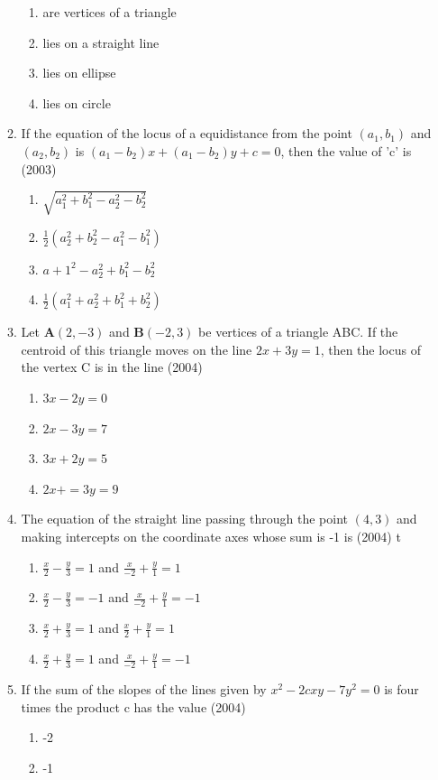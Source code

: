 \documentclass[12pt]{article}
\let\vec\mathbf
\begin{document}
\begin{enumerate}
\begin{enumerate}
\begin{enumerate}
\item are vertices of a triangle
\item lies on a straight line
\item lies on ellipse
\item lies on circle
\end{enumerate}
\item If the equation of the locus of a equidistance from the point $(a_1,b_1)$ and $(a_2,b_2)$ is $(a_1-b_2)x+(a_1-b_2)y+c=0$, then the value of 'c' is (2003)
\begin{enumerate}
\item $\sqrt{a_1^2+b_1^2-a_2^2-b_2^2}$
\item $\frac{1}{2}(a_2^2+b_2^2-a_1^2-b_1^2)$
\item $a+1^2-a_2^2+b_1^2-b_2^2$
\item $\frac{1}{2}(a_1^2+a_2^2+b_1^2+b_2^2)$
\end{enumerate}
\item Let $\vec{A}(2,-3)$ and $\vec{B}(-2,3)$ be vertices of a triangle ABC. If the centroid of this triangle moves on the line $2x+3y=1$, then the locus of the vertex C is in the line  (2004)
\begin{enumerate}
\item $3x-2y=0$
\item $2x-3y=7$ 
\item $3x+2y=5$ 
\item $2x+=3y=9$
\end{enumerate}
\item The equation of the straight line passing through the point $(4,3)$ and making intercepts on the coordinate axes whose sum is -1 is (2004)
t\begin{enumerate}
\item $\frac{x}{2}-\frac{y}{3}=1$ and $\frac{x}{-2}+\frac{y}{1}=1$
\item $\frac{x}{2}-\frac{y}{3}=-1$ and $\frac{x}{-2}+\frac{y}{1}=-1$
\item $\frac{x}{2}+\frac{y}{3}=1$ and $\frac{x}{2}+\frac{y}{1}=1$
\item $\frac{x}{2}+\frac{y}{3}=1$ and $\frac{x}{-2}+\frac{y}{1}=-1$
\end{enumerate}
\item If the sum of the slopes of the lines given by $x^2-2cxy-7y^2=0$ is four times the product c has the value (2004)
\begin{enumerate}
\item -2 
\item -1 

\end{enumerate}
\end{enumerate}
\end{enumerate}
\end{document}
